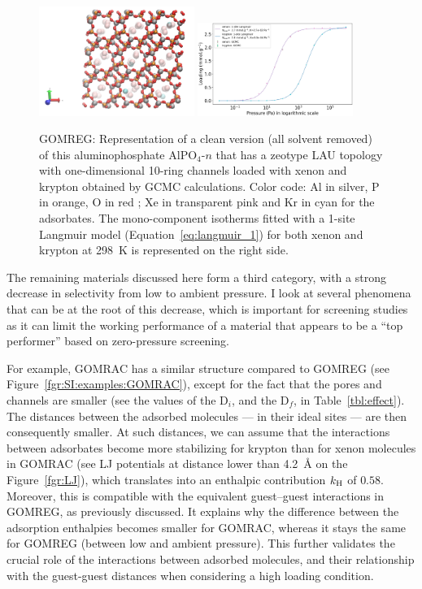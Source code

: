 \documentclass[main.tex]{subfiles}
\begin{document}
\begin{figure}[ht]
  \centering
    \includegraphics[width=0.45\textwidth]{figures/2-thermo/GOMREG_clean.jpg}
    \includegraphics[width=0.45\textwidth]{figures/2-thermo/GOMREG_clean_isotherm_xenon_krypton_298K.jpg}
    \caption{GOMREG: Representation of a clean version (all solvent removed) of this aluminophosphate AlPO$_4$-$n$ that has a zeotype LAU topology with one-dimensional 10-ring channels loaded with xenon and krypton obtained by GCMC calculations. Color code: Al in silver, P in orange, O in red ; Xe in transparent pink and Kr in cyan for the adsorbates. The mono-component isotherms fitted with a 1-site Langmuir model (Equation~\ref{eq:langmuir_1}) for both xenon and krypton at \SI{298}{\kelvin} is represented on the right side.}\label{fgr:SI:examples:GOMREG}
  \end{figure}

The remaining materials discussed here form a third category, with a strong decrease in selectivity from low to ambient pressure. I look at several phenomena that can be at the root of this decrease, which is important for screening studies as it can limit the working performance of a material that appears to be a ``top performer'' based on zero-pressure screening.


For example, GOMRAC has a similar structure compared to GOMREG (see Figure~\ref{fgr:SI:examples:GOMRAC}), except for the fact that the pores and channels are smaller (see the values of the D$_i$, and the D$_f$, in Table~\ref{tbl:effect}). The distances between the adsorbed molecules --- in their ideal sites --- are then consequently smaller. At such distances, we can assume that the interactions between adsorbates become more stabilizing for krypton than for xenon molecules in GOMRAC (see LJ potentials at distance lower than \SI{4.2}{\angstrom} on the Figure~\ref{fgr:LJ}), which translates into an enthalpic contribution $k_{\text{H}}$ of $0.58$. Moreover, this is compatible with the equivalent guest--guest interactions in GOMREG, as previously discussed. It explains why the difference between the adsorption enthalpies becomes smaller for GOMRAC, whereas it stays the same for GOMREG (between low and ambient pressure). This further validates the crucial role of the interactions between adsorbed molecules, and their relationship with the guest-guest distances when considering a high loading condition.
\end{document}
